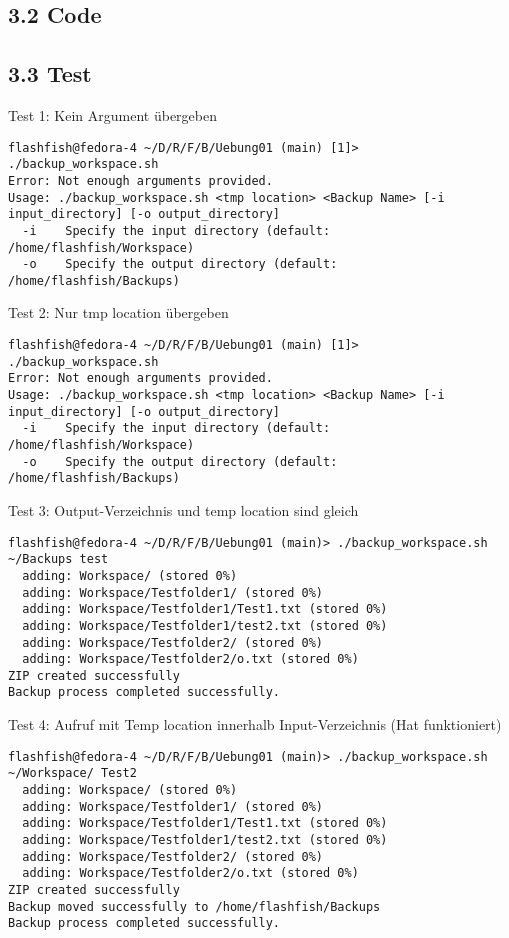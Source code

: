 \documentclass{report}
\begin{document}
\subsection*{3.2 Code}


\subsection*{3.3 Test}

Test 1: Kein Argument übergeben
\begin{lstlisting}[style=cppstyle, title=\texttt{Terminal Output}]
flashfish@fedora-4 ~/D/R/F/B/Uebung01 (main) [1]> ./backup_workspace.sh
Error: Not enough arguments provided.
Usage: ./backup_workspace.sh <tmp location> <Backup Name> [-i input_directory] [-o output_directory]
  -i    Specify the input directory (default: /home/flashfish/Workspace)
  -o    Specify the output directory (default: /home/flashfish/Backups)
\end{lstlisting}
Test 2: Nur tmp location übergeben
\begin{lstlisting}[style=cppstyle, title=\texttt{Terminal Output}]
flashfish@fedora-4 ~/D/R/F/B/Uebung01 (main) [1]> ./backup_workspace.sh
Error: Not enough arguments provided.
Usage: ./backup_workspace.sh <tmp location> <Backup Name> [-i input_directory] [-o output_directory]
  -i    Specify the input directory (default: /home/flashfish/Workspace)
  -o    Specify the output directory (default: /home/flashfish/Backups)
\end{lstlisting}
Test 3: Output-Verzeichnis und temp location sind gleich
\begin{lstlisting}[style=cppstyle, title=\texttt{Terminal Output}]
flashfish@fedora-4 ~/D/R/F/B/Uebung01 (main)> ./backup_workspace.sh ~/Backups test
  adding: Workspace/ (stored 0%)
  adding: Workspace/Testfolder1/ (stored 0%)
  adding: Workspace/Testfolder1/Test1.txt (stored 0%)
  adding: Workspace/Testfolder1/test2.txt (stored 0%)
  adding: Workspace/Testfolder2/ (stored 0%)
  adding: Workspace/Testfolder2/o.txt (stored 0%)
ZIP created successfully
Backup process completed successfully.
\end{lstlisting}
Test 4: Aufruf mit Temp location innerhalb Input-Verzeichnis (Hat funktioniert)
\begin{lstlisting}[style=cppstyle, title=\texttt{Terminal Output}]
flashfish@fedora-4 ~/D/R/F/B/Uebung01 (main)> ./backup_workspace.sh ~/Workspace/ Test2
  adding: Workspace/ (stored 0%)
  adding: Workspace/Testfolder1/ (stored 0%)
  adding: Workspace/Testfolder1/Test1.txt (stored 0%)
  adding: Workspace/Testfolder1/test2.txt (stored 0%)
  adding: Workspace/Testfolder2/ (stored 0%)
  adding: Workspace/Testfolder2/o.txt (stored 0%)
ZIP created successfully
Backup moved successfully to /home/flashfish/Backups
Backup process completed successfully.
\end{lstlisting}
\end{document}
